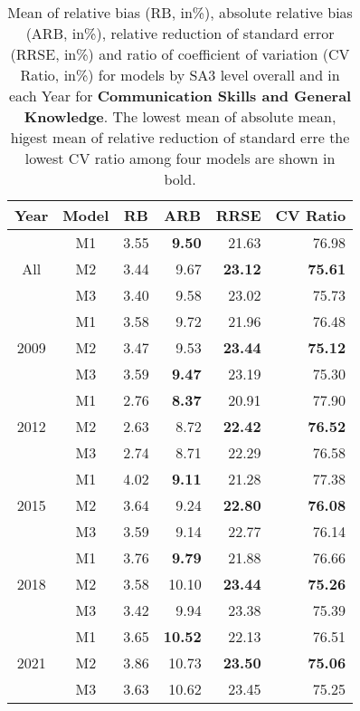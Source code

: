 \begin{table}[t]
\centering
\begin{tabular}{ccrrrr}
\hline
Year & Model & \multicolumn{1}{c}{RB} & \multicolumn{1}{c}{ARB} & \multicolumn{1}{c}{RRSE} & \multicolumn{1}{c}{CV Ratio} \\ \hline
\multirow{3}{*}{All} & M1 & 3.55 & \textbf{9.50} & 21.63 & 76.98 \\
 & M2 & 3.44 & 9.67 & \textbf{23.12} & \textbf{75.61} \\
 & M3 & 3.40 & 9.58 & 23.02 & 75.73 \\ \hline
\multirow{3}{*}{2009} & M1 & 3.58 & 9.72 & 21.96 & 76.48 \\
 & M2 & 3.47 & 9.53 & \textbf{23.44} & \textbf{75.12} \\
 & M3 & 3.59 & \textbf{9.47} & 23.19 & 75.30 \\ \hline
\multirow{3}{*}{2012} & M1 & 2.76 & \textbf{8.37} & 20.91 & 77.90 \\
 & M2 & 2.63 & 8.72 & \textbf{22.42} & \textbf{76.52} \\
 & M3 & 2.74 & 8.71 & 22.29 & 76.58 \\ \hline
\multirow{3}{*}{2015} & M1 & 4.02 & \textbf{9.11} & 21.28 & 77.38 \\
 & M2 & 3.64 & 9.24 & \textbf{22.80} & \textbf{76.08} \\
 & M3 & 3.59 & 9.14 & 22.77 & 76.14 \\ \hline
\multirow{3}{*}{2018} & M1 & 3.76 & \textbf{9.79} & 21.88 & 76.66 \\
 & M2 & 3.58 & 10.10 & \textbf{23.44} & \textbf{75.26} \\
 & M3 & 3.42 & 9.94 & 23.38 & 75.39 \\ \hline
\multirow{3}{*}{2021} & M1 & 3.65 & \textbf{10.52} & 22.13 & 76.51 \\
 & M2 & 3.86 & 10.73 & \textbf{23.50} & \textbf{75.06} \\
 & M3 & 3.63 & 10.62 & 23.45 & 75.25 \\ \hline
\end{tabular}
\caption{Mean of relative bias (RB, in\%), absolute relative bias (ARB, in\%), relative reduction of standard error (RRSE, in\%) and ratio of coefficient of variation (CV Ratio, in\%) for models by SA3 level overall and in each Year for \textbf{Communication Skills and General Knowledge}. The lowest mean of absolute mean, higest mean of relative reduction of standard erre the lowest CV ratio among four models are shown in bold.}
\label{tab:Model_Part2_Communication_Perf}
\end{table}